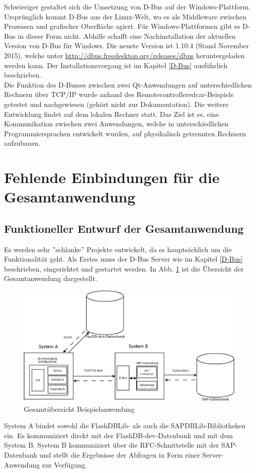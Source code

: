 Schwieriger gestaltet sich die Umsetzung von D-Bus auf der Windows-Plattform. Ursprünglich kommt D-Bus aus der Linux-Welt, wo es als Middleware zwischen Prozessen und grafischer Oberfläche agiert. Für Windows-Plattformen gibt es D-Bus in dieser Form nicht. Abhilfe schafft eine Nachinstallation der aktuellen Version von D-Bus für Windows. Die neuste Version  ist 1.10.4 (Stand November 2015), welche unter \url{http://dbus.freedesktop.org/releases/dbus} heruntergeladen werden kann. Der Installationsvorgang ist im Kapitel \ref{D-Bus} ausführlich beschrieben.\\
Die Funktion des D-Busses zwischen zwei Qt-Anwendungen auf unterschiedlichen Rechnern über TCP/IP wurde anhand des Remotecontrolleredcar-Beispiels getestet und nachgewiesen (gehört nicht zur Dokumentation). Die weitere Entwicklung findet auf dem lokalen Rechner statt. Das Ziel ist es, eine Kommunikation zwischen zwei Anwendungen, welche in unterschiedlichen Programmiersprachen entwickelt wurden, auf physikalisch getrennten Rechnern aufzubauen.
\newpage
\section{Fehlende Einbindungen für die Gesamtanwendung} \label{BeispielQt}
\subsection{Funktioneller Entwurf der Gesamtanwendung}
Es werden sehr ''schlanke'' Projekte entwickelt, da es hauptsächlich um die Funktionalität geht. Als Erstes muss der D-Bus Server wie im Kapitel \ref{D-Bus} beschrieben, eingerichtet und gestartet werden. In Abb. \ref{fig:BeispielQtDbusNet} ist die Übersicht der Gesamtanwendung dargestellt.

\begin{figure}[H]
	\centering
	\includegraphics[width=1\linewidth]{images/BeispielQtDbusNet}
	\caption[Gesamtübersicht Beispielanwendung]{Gesamtübersicht Beispielanwendung}
	\label{fig:BeispielQtDbusNet}
\end{figure}
System A bindet sowohl die FlashDBLib- als auch die SAPDBLib-Bibliotheken ein. Es kommuniziert direkt mit der FlashDB-dev-Datenbank und mit dem System B. System B kommuniziert über die RFC-Schnittstelle mit der SAP-Datenbank und stellt die Ergebnisse der Abfragen in Form einer Server-Anwendung zur Verfügung.\\

